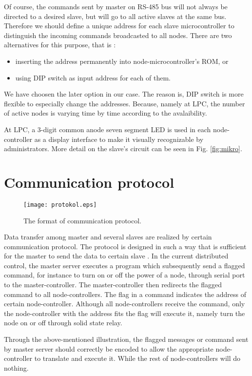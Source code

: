 \documentclass[conference,letterpaper]{IEEEtran}
\begin{document}
Of course, the commands sent by master on RS-485 bus will not always be directed to a desired slave, but will go to all active slaves at the same bus. Therefore we should define a unique address for each slave microcontroller to distinguish the incoming commands broadcasted to all nodes. There are two alternatives for this purpose, that is : 
\begin{itemize}
 \item inserting the address permanently into node-microcontroller’s ROM, or 
\item using DIP switch as input address for each of them.
\end{itemize}
We have choosen the later option in our case. The reason is, DIP switch is more flexible to especially change the addresses. Because, namely at LPC, the number of active nodes is varying time by time according to the avalaibility.

At LPC, a 3-digit common anode seven segment LED is used in each node-controller as a display interface to make it visually recognizable by administrators. More detail on the slave’s circuit can be seen in Fig. \ref{fig:mikro}.

\section{Communication protocol}
\label{sec:komunikasi}

\begin{figure}[b]
 \centering
 \texttt{[image: protokol.eps]}
 \caption{The format of communication protocol.}
 \label{fig:protokol}
\end{figure}

Data transfer among master and several slaves are realized by certain communication protocol. The protocol is designed in such a way that  is sufficient for the master to send the data to certain slave \cite{bolic,vinogradov}. In the current distributed control, the master server executes a program which subsequently send a flagged command, for instance to turn on or off the power of a node, through serial port to the master-controller. The master-controller then redirects the flagged command to all node-controllers. The flag in a command indicates the address of certain node-controller. Although all node-controllers receive the command, only the node-controller with the address fits the flag will execute it, namely turn the node on or off through solid state relay. 

Through the above-mentioned illustration, the flagged messages or command sent by master server should correctly be encoded to allow the appropriate node-controller to translate and execute it. While the rest of node-controllers will do nothing.
\end{document}
